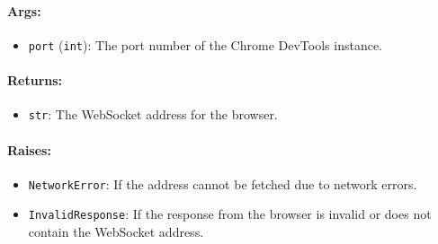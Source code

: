 \documentclass{article}
\begin{document}
\paragraph{Args:}
\begin{itemize}
    \item \texttt{port} (\texttt{int}): The port number of the Chrome DevTools instance.
\end{itemize}

\paragraph{Returns:}
\begin{itemize}
    \item \texttt{str}: The WebSocket address for the browser.
\end{itemize}

\paragraph{Raises:}
\begin{itemize}
    \item \texttt{NetworkError}: If the address cannot be fetched due to network errors.
    \item \texttt{InvalidResponse}: If the response from the browser is invalid or does not contain the WebSocket address.
\end{itemize}
\end{document}
